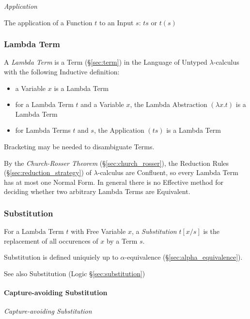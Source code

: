 \emph{Application}

The application of a Function $t$ to an Input $s$: $ts$ or $t(s)$



\subsubsection{Lambda Term}\label{sec:lambda_term}

A \emph{Lambda Term} is a Term (\S\ref{sec:term}) in the Language of
Untyped $\lambda$-calculus with the following Inductive definition:
\begin{itemize}
  \item a Variable $x$ is a Lambda Term
  \item for a Lambda Term $t$ and a Variable $x$, the Lambda
    Abstraction $(\lambda x.t)$ is a Lambda Term
  \item for Lambda Terms $t$ and $s$, the Application $(ts)$ is a
    Lambda Term
\end{itemize}
Bracketing may be needed to disambiguate Terms.

By the \emph{Church-Rosser Theorem} (\S\ref{sec:church_rosser}), the
Reduction Rules (\S\ref{sec:reduction_strategy}) of $\lambda$-calculus
are Confluent, so every Lambda Term has at most one Normal Form. In
general there is no Effective method for deciding whether two
arbitrary Lambda Terms are Equivalent.




\subsubsection{Substitution}\label{sec:lambda_substitution}

For a Lambda Term $t$ with Free Variable $x$, a \emph{Substitution}
$t[x/s]$ is the replacement of all occurences of $x$ by a Term $s$.

Substitution is defined uniquiely up to $\alpha$-equivalence
(\S\ref{sec:alpha_equivalence}).

\fist See also Substitution (Logic \S\ref{sec:substitution})



\paragraph{Capture-avoiding Substitution}\label{sec:capture_avoiding}\hfill

\emph{Capture-avoiding Substitution}

